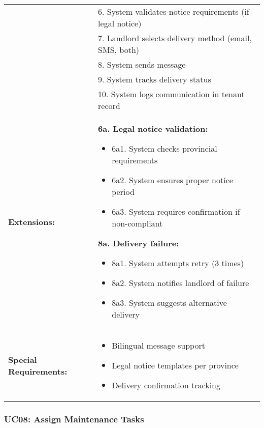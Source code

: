 \documentclass[12pt]{article}
\begin{document}
\begin{longtable}{|p{3cm}|p{11cm}|}
& 6. System validates notice requirements (if legal notice) \\
& 7. Landlord selects delivery method (email, SMS, both) \\
& 8. System sends message \\
& 9. System tracks delivery status \\
& 10. System logs communication in tenant record \\
\hline
\textbf{Extensions:} & 
\textbf{6a. Legal notice validation:}
\begin{itemize}
    \item 6a1. System checks provincial requirements
    \item 6a2. System ensures proper notice period
    \item 6a3. System requires confirmation if non-compliant
\end{itemize}
\textbf{8a. Delivery failure:}
\begin{itemize}
    \item 8a1. System attempts retry (3 times)
    \item 8a2. System notifies landlord of failure
    \item 8a3. System suggests alternative delivery
\end{itemize} \\
\hline
\textbf{Special Requirements:} & 
\begin{itemize}
    \item Bilingual message support
    \item Legal notice templates per province
    \item Delivery confirmation tracking
\end{itemize} \\
\hline
\end{longtable}

\subsubsection{UC08: Assign Maintenance Tasks}
\end{document}
